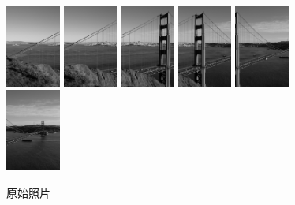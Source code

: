 \documentclass[11pt,a4paper]{article}
\begin{document}
\begin{figure}[H]
    \centering
    \includegraphics[width=0.16\textwidth]{../data/goldengate/00.jpg}
    \includegraphics[width=0.16\textwidth]{../data/goldengate/01.jpg}
    \includegraphics[width=0.16\textwidth]{../data/goldengate/02.jpg}
    \includegraphics[width=0.16\textwidth]{../data/goldengate/03.jpg}
    \includegraphics[width=0.16\textwidth]{../data/goldengate/04.jpg}
    \includegraphics[width=0.16\textwidth]{../data/goldengate/05.jpg}
    \caption{原始照片}
    \label{fig:golden_org}
\end{figure}
\end{document}
